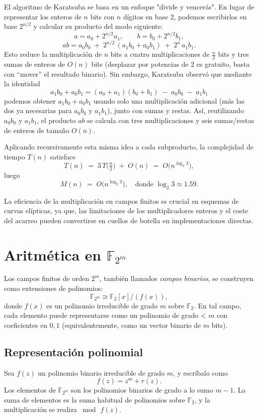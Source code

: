 El algoritmo de Karatsuba se basa en un enfoque "divide y vencerás". En lugar de representar los enteros de \(n\) bits con \(n\) dígitos en base 2, podemos escribirlos en base \(2^{n/2}\) y calcular su producto del modo siguiente:
\[
  a = a_0 + 2^{n/2}a_1,\qquad
  b = b_0 + 2^{n/2}b_1,
\]
\[
  ab = a_0b_0 \;+\; 2^{n/2}\,(a_1b_0 + a_0b_1)\;+\;2^n\,a_1b_1.
\]
Esto reduce la multiplicación de \(n\) bits a cuatro multiplicaciones de \(\tfrac n2\) bits y tres sumas de enteros de \(O(n)\) bits (desplazar por potencias de 2 es gratuito, basta con “mover” el resultado binario). Sin embargo, Karatsuba observó que mediante la identidad
\[
  a_1b_0 + a_0b_1
  = (a_0 + a_1)(b_0 + b_1) \;-\; a_0b_0 \;-\; a_1b_1
\]
podemos obtener \(a_1b_0 + a_0b_1\) usando solo una multiplicación adicional (más las dos ya necesarias para \(a_0b_0\) y \(a_1b_1\)), junto con sumas y restas. Así, reutilizando \(a_0b_0\) y \(a_1b_1\), el producto \(ab\) se calcula con tres multiplicaciones y seis sumas/restas de enteros de tamaño \(O(n)\). 

Aplicando recursivamente esta misma idea a cada subproducto, la complejidad de tiempo \(T(n)\) satisface
\[
  T(n) \;=\; 3\,T\bigl(\tfrac n2\bigr) \;+\; O(n)
  \;=\; O\bigl(n^{\log_2 3}\bigr),
\]
luego
\[
  M(n)\;=\;O\bigl(n^{\log_2 3}\bigr),
  \quad\text{donde }\log_2 3\approx1.59.
\]

La eficiencia de la multiplicación en campos finitos es crucial en esquemas de curvas elípticas, ya que, las limitaciones de los multiplicadores enteros y el coste del acarreo pueden convertirse en cuellos de botella en implementaciones directas.

\section{Aritmética en \texorpdfstring{$\mathbb{F}_{2^m}$}{F2m}}
Los campos finitos de orden $2^m$, también llamados \emph{campos binarios}, se construyen como extensiones de polinomios:
\[
  \mathbb{F}_{2^m}\cong\mathbb{F}_2[x]/(f(x)),
\]
donde $f(x)$ es un polinomio irreducible de grado $m$ sobre $\mathbb{F}_2$.
En tal campo, cada elemento puede representarse como un polinomio de grado < $m$ con coeficientes en ${0,1}$ (equivalentemente, como un vector binario de $m$ bits).

\subsection{Representación polinomial}
Sea \(f(z)\) un polinomio binario irreducible de grado \(m\), y escríbalo como
\[
  f(z) = z^m + r(z).
\]
Los elementos de \(\mathbb{F}_{2^m}\) son los polinomios binarios de grado a lo sumo \(m-1\). La suma de elementos es la suma habitual de polinomios sobre \(\mathbb{F}_2\), y la multiplicación se realiza \(\bmod\,f(z)\).

